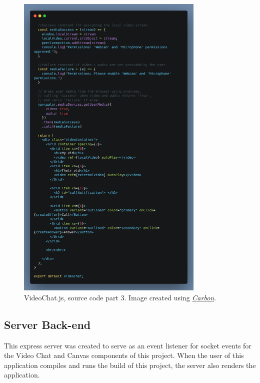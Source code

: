 \begin{figure}[H]
    \centering
    \includegraphics[width=0.8\textwidth]{img/SystemDesign/videoChatJs_3.png}
    \caption{VideoChat.js, source code part 3. Image created using \href{https://carbon.now.sh/}{\textit{Carbon}}.}
\end{figure}
\subsection{Server Back-end}
This express server was created to serve as an event listener for socket events for the Video Chat and Canvas components of this project. When the user of this application compiles and runs the build of this project, the server also renders the application.
